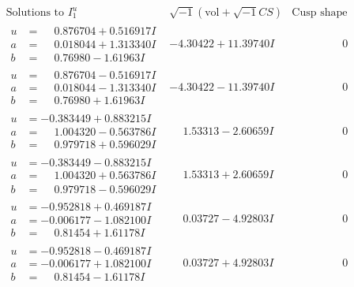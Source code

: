 \documentclass[1p]{elsarticle_modified}
\theoremstyle{definition}
\newcommand{\I}{\sqrt{-1}}
\begin{document}
$$\begin{array}{c|c|c}  
\text{Solutions to }I^u_{1}& \I (\text{vol} + \sqrt{-1}CS) & \text{Cusp shape}\\
 \hline 
\begin{aligned}
u &= \phantom{-}0.876704 + 0.516917 I \\
a &= \phantom{-}0.018044 + 1.313340 I \\
b &= \phantom{-}0.76980 - 1.61963 I\end{aligned}
 & -4.30422 + 11.39740 I & \phantom{-0.000000 } 0 \\ \hline\begin{aligned}
u &= \phantom{-}0.876704 - 0.516917 I \\
a &= \phantom{-}0.018044 - 1.313340 I \\
b &= \phantom{-}0.76980 + 1.61963 I\end{aligned}
 & -4.30422 - 11.39740 I & \phantom{-0.000000 } 0 \\ \hline\begin{aligned}
u &= -0.383449 + 0.883215 I \\
a &= \phantom{-}1.004320 - 0.563786 I \\
b &= \phantom{-}0.979718 + 0.596029 I\end{aligned}
 & \phantom{-}1.53313 - 2.60659 I & \phantom{-0.000000 } 0 \\ \hline\begin{aligned}
u &= -0.383449 - 0.883215 I \\
a &= \phantom{-}1.004320 + 0.563786 I \\
b &= \phantom{-}0.979718 - 0.596029 I\end{aligned}
 & \phantom{-}1.53313 + 2.60659 I & \phantom{-0.000000 } 0 \\ \hline\begin{aligned}
u &= -0.952818 + 0.469187 I \\
a &= -0.006177 - 1.082100 I \\
b &= \phantom{-}0.81454 + 1.61178 I\end{aligned}
 & \phantom{-}0.03727 - 4.92803 I & \phantom{-0.000000 } 0 \\ \hline\begin{aligned}
u &= -0.952818 - 0.469187 I \\
a &= -0.006177 + 1.082100 I \\
b &= \phantom{-}0.81454 - 1.61178 I\end{aligned}
 & \phantom{-}0.03727 + 4.92803 I & \phantom{-0.000000 } 0 \\ \hline\begin{aligned}

\end{aligned}
\end{array}$$
\end{document}
